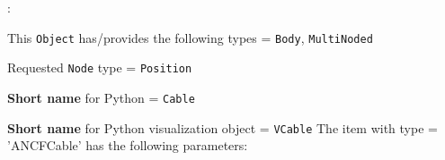 \noindent {}:
\bi
  \item This \texttt{Object} has/provides the following types = \texttt{Body}, \texttt{MultiNoded}
  \item Requested \texttt{Node} type = \texttt{Position}
  \item {\bf Short name} for Python = \texttt{Cable}
  \item {\bf Short name} for Python visualization object = \texttt{VCable}
\ei\vspace{12pt} \noindent 
The item  with type = 'ANCFCable' has the following parameters:
\vspace{-0.5cm}\\
\vspace{-0.5cm}\\
